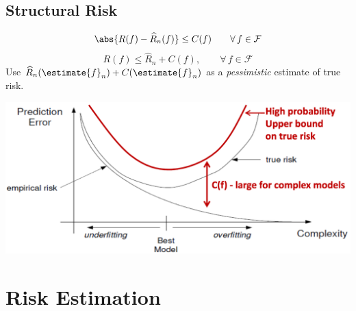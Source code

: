 \documentclass[18pt,a3paper,landscape, ncols=3]{cheatsheet}
\begin{document}
	\subsection{Structural Risk}
		\begin{mdframed}
			\begin{minipage}{.5\textwidth}
				\[
					\abs{R(f) - \widehat{R}_{n}(f)} \leq C(f)\qquad \forall\, f \in \mathcal{F}
				\]
				\[
					R(f) \leq \widehat{R}_{n} + C(f),\qquad \forall\, f \in \mathcal{F}
				\]
				Use \(\widehat{R}_{n}(\estimate{f}_{n}) + C(\estimate{f}_{n})\) as a \textit{pessimistic} estimate of true risk.
			\end{minipage}%
			\begin{minipage}{.5\textwidth}
				\includegraphics{structural_risk_curve.png}
			\end{minipage}
		\end{mdframed}

	\section{Risk Estimation}
\end{document}
